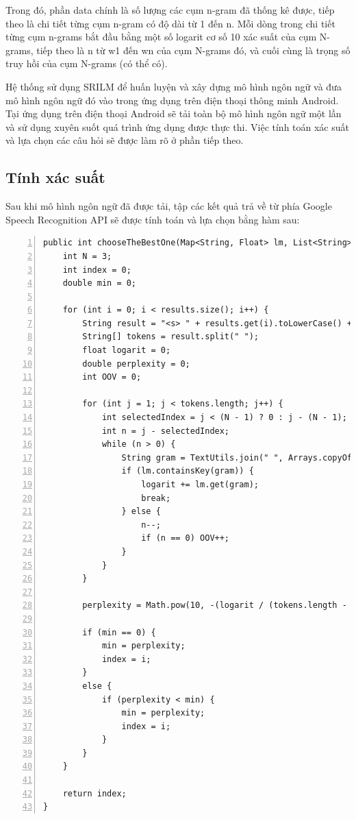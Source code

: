 \documentclass[12pt]{report}
\begin{document}
Trong đó, phần data chính là số lượng các cụm n-gram đã thống kê được, tiếp theo là chi tiết từng cụm n-gram có độ dài từ 1 đến n. Mỗi dòng trong chi tiết từng cụm n-grams bắt đầu bằng một số logarit cơ số 10 xác suất của cụm N-grams, tiếp theo là n từ w1 đến wn của cụm N-grams đó, và cuối cùng là trọng số truy hồi của cụm N-grams (có thể có).

Hệ thống sử dụng SRILM để huấn luyện và xây dựng mô hình ngôn ngữ và đưa mô hình ngôn ngữ đó vào trong ứng dụng trên điện thoại thông minh Android. Tại ứng dụng trên điện thoại Android sẽ tải toàn bộ mô hình ngôn ngữ một lần và sử dụng xuyên suốt quá trình ứng dụng được thực thi. Việc tính toán xác suất và lựa chọn các câu hỏi sẽ được làm rõ ở phần tiếp theo.

\subsection{Tính xác suất}

Sau khi mô hình ngôn ngữ đã được tải, tập các kết quả trả về từ phía Google Speech Recognition API sẽ được tính toán và lựa chọn bằng hàm sau:

\begin{lstlisting}[frame=lines, basicstyle=\footnotesize\ttfamily, numbers=left, numberstyle=\tiny\color{black},caption= {Hàm chọn câu }, backgroundcolor=\color{background}]
public int chooseTheBestOne(Map<String, Float> lm, List<String> results) {
	int N = 3;
    int index = 0;
    double min = 0;

    for (int i = 0; i < results.size(); i++) {
        String result = "<s> " + results.get(i).toLowerCase() + " </s>";
        String[] tokens = result.split(" ");
        float logarit = 0;
        double perplexity = 0;
        int OOV = 0;

        for (int j = 1; j < tokens.length; j++) {
            int selectedIndex = j < (N - 1) ? 0 : j - (N - 1);
            int n = j - selectedIndex;
            while (n > 0) {
                String gram = TextUtils.join(" ", Arrays.copyOfRange(tokens, selectedIndex, selectedIndex + n));
                if (lm.containsKey(gram)) {
                    logarit += lm.get(gram);
                    break;
                } else {
                    n--;
                    if (n == 0) OOV++;
                }
            }
        }

        perplexity = Math.pow(10, -(logarit / (tokens.length - 2 - OOV)));

        if (min == 0) {
            min = perplexity;
            index = i;
        }
        else {
            if (perplexity < min) {
                min = perplexity;
                index = i;
            }
        }
    }

    return index;
}
\end{lstlisting}
\end{document}
